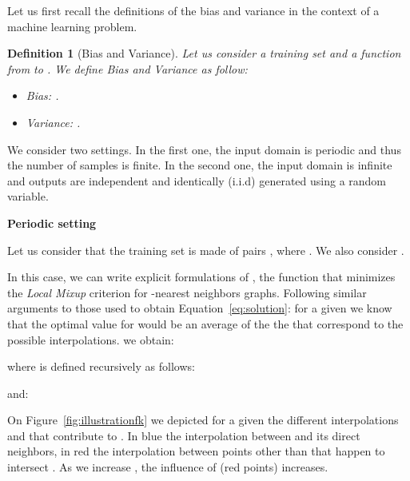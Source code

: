 \documentclass[twoside]{article}
\numberwithin{intassumption}{assumption}
\newtheorem{definition}{Definition}[section]
\begin{document}
Let us first recall the definitions of the bias and variance in the context of a machine learning problem.

\begin{definition}[Bias and Variance] Let us consider a training set  and a function  from  to . We define Bias and Variance as follow:
\begin{itemize}
    \item \emph{Bias}: .
    \item \emph{Variance}: .
\end{itemize}
\end{definition}

We consider two settings. In the first one, the input domain  is periodic and thus the number of samples is finite. In the second one, the input domain  is infinite and outputs are independent and identically (i.i.d) generated using a random variable.
\newline 

\textbf{Periodic setting}

Let us consider that the training set  is made of pairs , where . We also consider .

In this case, we can write explicit formulations of , the function that minimizes the \emph{Local Mixup} criterion for -nearest neighbors graphs. Following similar arguments to those used to obtain Equation~\eqref{eq:solution}: for a given  we know that the optimal value for  would be an average of the the  that correspond to the possible interpolations.
we obtain:
 
where  is defined recursively as follows:

and:

On Figure~\ref{fig:illustrationfk} we depicted for a given  the different interpolations and  that contribute to . In blue the interpolation between  and its direct neighbors, in red the interpolation between points other than  that happen to intersect . As we increase , the influence of  (red points) increases. 
\end{document}
